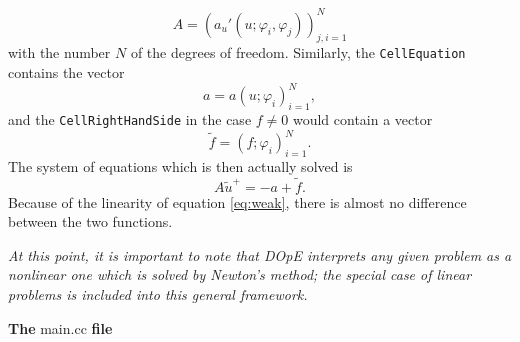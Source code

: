 \begin{equation*}
  A = (a_u'(u;\varphi_i,\varphi_j))_{j,i=1}^N
\end{equation*}
with the number $N$ of the degrees of freedom. Similarly, the \texttt{CellEquation} contains the vector
\begin{equation*}
  a = a(u;\varphi_i)_{i=1}^{N},
\end{equation*}
and the \texttt{CellRightHandSide} in the case $f \neq 0$ would contain a vector
\begin{equation*}
  \tilde{f} = (f;\varphi_i)_{i=1}^N.
\end{equation*}
The system of equations which is then actually solved is
\begin{equation*}
  A\tilde{u}^+ = -a + \tilde{f}.
\end{equation*}
Because of the linearity of equation \eqref{eq:weak}, there is almost no difference between the two functions.\\

\vspace{0.1cm}

\textit{At this point, it is important to note that DOpE interprets any given problem as a nonlinear one which is solved by Newton's method; the special case of linear problems is included into this general framework.}\\

\vspace{0.2cm}

\textbf{The} main.cc \textbf{file}\\

\vspace{0.2cm}

